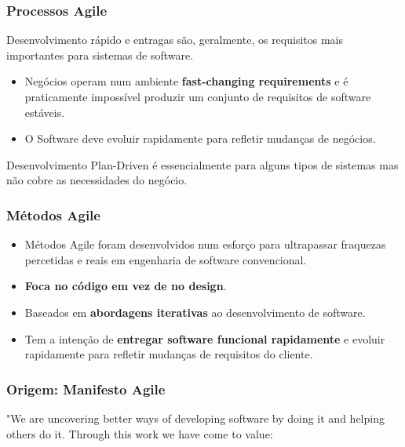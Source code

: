 \documentclass{article}
\begin{document}
\subsubsection{Processos Agile}

Desenvolvimento rápido e entragas são, geralmente, os requisitos
mais importantes para sistemas de software.
\begin{itemize}
  \item Negócios operam num ambiente \textbf{fast-changing requirements}
  e é praticamente impossível produzir um conjunto de requisitos de software
  estáveis.
  \item O Software deve evoluir rapidamente para refletir mudanças de
  negócios.
\end{itemize}

\vspace{2mm}

Desenvolvimento Plan-Driven é essencialmente para alguns tipos de sistemas
mas não cobre as necessidades do negócio.

\subsubsection*{Métodos Agile}

\begin{itemize}
  \item Métodos Agile foram desenvolvidos num esforço para ultrapassar
  fraquezas percetidas e reais em engenharia de software convencional.
  
  \item \textbf{Foca no código em vez de no design}.
  
  \item Baseados em \textbf{abordagens iterativas} ao desenvolvimento
  de software.

  \item Tem a intenção de \textbf{entregar software funcional rapidamente}
  e evoluir rapidamente para refletir mudanças de requisitos do cliente.
\end{itemize}

\pagebreak

\subsubsection{Origem: Manifesto Agile}

"We are uncovering better ways of developing
software by doing it and helping others do it.
Through this work we have come to value:
\end{document}
